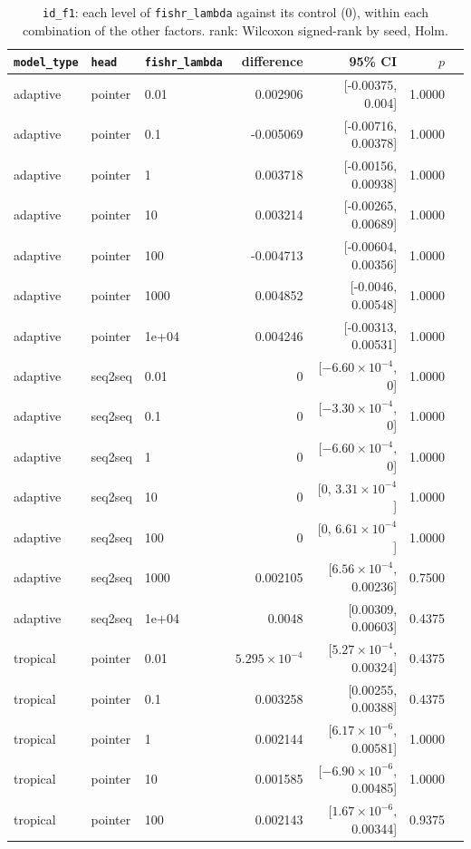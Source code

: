 \documentclass[10pt]{article}
\begin{document}
{\small
\begin{longtable}{lllrrrl}
\caption{\texttt{id\_f1}: each level of \texttt{fishr\_lambda} against its control (0), within each combination of the other factors. rank: Wilcoxon signed-rank by seed, Holm.}\label{tab:control-id_f1}\\
\toprule
\texttt{model\_type} & \texttt{head} & \texttt{fishr\_lambda} & difference & 95\% CI & $p$ & \\
\midrule
\endhead
adaptive & pointer & 0.01 & 0.002906 & [-0.00375, 0.004] & 1.0000 & \\
adaptive & pointer & 0.1 & -0.005069 & [-0.00716, 0.00378] & 1.0000 & \\
adaptive & pointer & 1 & 0.003718 & [-0.00156, 0.00938] & 1.0000 & \\
adaptive & pointer & 10 & 0.003214 & [-0.00265, 0.00689] & 1.0000 & \\
adaptive & pointer & 100 & -0.004713 & [-0.00604, 0.00356] & 1.0000 & \\
adaptive & pointer & 1000 & 0.004852 & [-0.0046, 0.00548] & 1.0000 & \\
adaptive & pointer & 1e+04 & 0.004246 & [-0.00313, 0.00531] & 1.0000 & \\
adaptive & seq2seq & 0.01 & 0 & [$-6.60\times10^{-4}$, 0] & 1.0000 & \\
adaptive & seq2seq & 0.1 & 0 & [$-3.30\times10^{-4}$, 0] & 1.0000 & \\
adaptive & seq2seq & 1 & 0 & [$-6.60\times10^{-4}$, 0] & 1.0000 & \\
adaptive & seq2seq & 10 & 0 & [0, $3.31\times10^{-4}$] & 1.0000 & \\
adaptive & seq2seq & 100 & 0 & [0, $6.61\times10^{-4}$] & 1.0000 & \\
adaptive & seq2seq & 1000 & 0.002105 & [$6.56\times10^{-4}$, 0.00236] & 0.7500 & \\
adaptive & seq2seq & 1e+04 & 0.0048 & [0.00309, 0.00603] & 0.4375 & \\
tropical & pointer & 0.01 & $5.295\times10^{-4}$ & [$5.27\times10^{-4}$, 0.00324] & 0.4375 & \\
tropical & pointer & 0.1 & 0.003258 & [0.00255, 0.00388] & 0.4375 & \\
tropical & pointer & 1 & 0.002144 & [$6.17\times10^{-6}$, 0.00581] & 1.0000 & \\
tropical & pointer & 10 & 0.001585 & [$-6.90\times10^{-6}$, 0.00485] & 1.0000 & \\
tropical & pointer & 100 & 0.002143 & [$1.67\times10^{-6}$, 0.00344] & 0.9375 & \\

\end{longtable}}
\end{document}
